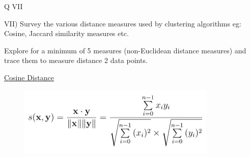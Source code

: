 \documentclass[12pt]{article}
\renewcommand{\_}{\kern-1.5pt\textunderscore\kern-1.5pt}
\begin{document}

\par


\vspace{\baselineskip}

\vspace{\baselineskip}

\vspace{\baselineskip}

\vspace{\baselineskip}

\vspace{\baselineskip}

\vspace{\baselineskip}

\vspace{\baselineskip}

\vspace{\baselineskip}
\begin{Center}
{\fontsize{28pt}{33.6pt}\selectfont Q VII\par}
\end{Center}\par

{\fontsize{14pt}{16.8pt}\selectfont VII) Survey the various distance measures used by clustering algorithms eg: Cosine, Jaccard similarity measures etc.\par}\par

{\fontsize{14pt}{16.8pt}\selectfont Explore for a minimum of 5 measures (non-Euclidean distance measures) and trace them to measure distance 2 data points.\par}\par


\vspace{\baselineskip}
{\fontsize{14pt}{16.8pt}\selectfont \uline{Cosine Distance}\par}\par




\begin{figure}[H]
	\begin{Center}
		\includegraphics[width=3.73in,height=1.3in]{./media/image6.png}
	\end{Center}
\end{figure}
\end{document}
